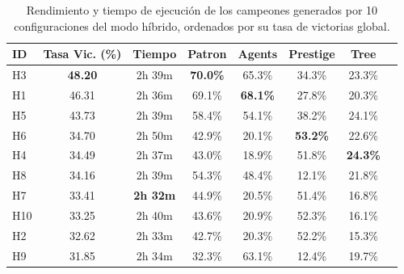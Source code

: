 \begin{table}[H]
	\centering
	\caption{Rendimiento y tiempo de ejecución de los campeones generados por 10 configuraciones del modo híbrido, ordenados por su tasa de victorias global.}
	\label{tab:hybrid_results}
	\begin{tabular}{@{}lccccccc@{}}
		\toprule
		\textbf{ID} & \textbf{Tasa Vic. (\%)} & \textbf{Tiempo} & \textbf{Patron} & \textbf{Agents} & \textbf{Prestige} & \textbf{Tree}   \\
		\midrule
		H3          & \textbf{48.20}          & 2h 39m          & \textbf{70.0\%} & 65.3\%          & 34.3\%            & 23.3\%          \\
		H1          & 46.31                   & 2h 36m          & 69.1\%          & \textbf{68.1\%} & 27.8\%            & 20.3\%          \\
		H5          & 43.73                   & 2h 39m          & 58.4\%          & 54.1\%          & 38.2\%            & 24.1\%          \\
		H6          & 34.70                   & 2h 50m          & 42.9\%          & 20.1\%          & \textbf{53.2\%}   & 22.6\%          \\
		H4          & 34.49                   & 2h 37m          & 43.0\%          & 18.9\%          & 51.8\%            & \textbf{24.3\%} \\
		H8          & 34.16                   & 2h 39m          & 54.3\%          & 48.4\%          & 12.1\%            & 21.8\%          \\
		H7          & 33.41                   & \textbf{2h 32m} & 44.9\%          & 20.5\%          & 51.4\%            & 16.8\%          \\
		H10         & 33.25                   & 2h 40m          & 43.6\%          & 20.9\%          & 52.3\%            & 16.1\%          \\
		H2          & 32.62                   & 2h 33m          & 42.7\%          & 20.3\%          & 52.2\%            & 15.3\%          \\
		H9          & 31.85                   & 2h 34m          & 32.3\%          & 63.1\%          & 12.4\%            & 19.7\%          \\
		\bottomrule
	\end{tabular}
\end{table}

